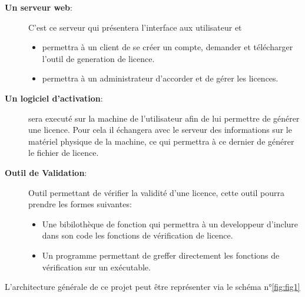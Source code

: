 \begin{description}
	\item[\textbf{Un serveur web}:]
				C'est ce serveur qui présentera l'interface aux utilisateur et  
				\begin{itemize}
					\item permettra à un client de se créer un compte, demander et 
								télécharger l'outil de generation de licence.
					\item permettra à un administrateur d'accorder et de gérer les licences. 
				\end{itemize}
	\item[\textbf{Un logiciel d'activation}:] 
				sera executé sur la machine de l'utilisateur
				afin de lui permettre de générer une licence. Pour cela il échangera avec
				le serveur des informations sur le matériel physique de la machine, ce 
				qui permettra à ce dernier de générer le fichier de licence.
	\item[\textbf{Outil de Validation}:]
				Outil permettant de vérifier la validité d'une licence, cette outil
				pourra prendre les formes suivantes: 
				\begin{itemize}
				\item Une bibilothèque de fonction qui permettra à un developpeur d'inclure
							dans son code les fonctions de vérification de licence. 
				\item Un programme permettant de greffer directement les fonctions de vérification
							sur un exécutable. 
				\end{itemize}
\end{description}

L'architecture générale de ce projet peut être représenter via 
le schéma n°\ref{fig:fig1}\newline

